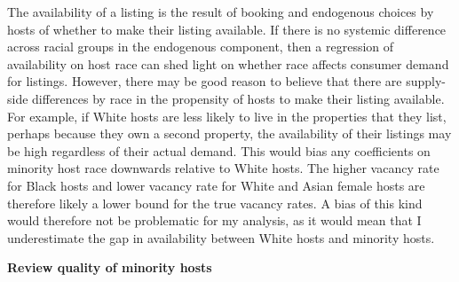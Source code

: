 The availability of a listing is the result of booking and endogenous choices by hosts of whether to make their listing available. If there is no systemic difference across racial groups in the endogenous component, then a regression of availability on host race can shed light on whether race affects consumer demand for listings. However, there may be good reason to believe that there are supply-side differences by race in the propensity of hosts to make their listing available. For example, if White hosts are less likely to live in the properties that they list, perhaps because they own a second property, the availability of their listings may be high regardless of their actual demand. This would bias any coefficients on minority host race downwards relative to White hosts. The higher vacancy rate for Black hosts and lower vacancy rate for White and Asian female hosts are therefore likely a lower bound for the true vacancy rates. A bias of this kind would therefore not be problematic for my analysis, as it would mean that I underestimate the gap in availability between White hosts and minority hosts.  



 

\textbf{Review quality of minority hosts} 

